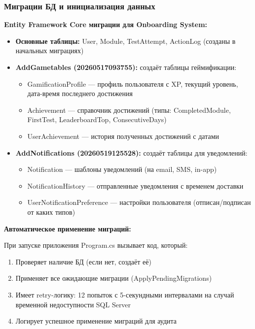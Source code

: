 \subsubsection*{Миграции БД и инициализация данных}

\textbf{Entity Framework Core миграции для Onboarding System:}

\begin{itemize}
	\item \textbf{Основные таблицы:} User, Module, TestAttempt, ActionLog (созданы в начальных миграциях)
	\item \textbf{AddGametables (20260517093755):} создаёт таблицы геймификации:
	\begin{itemize}
		\item GamificationProfile --- профиль пользователя с XP, текущий уровень, дата-время последнего достижения
		\item Achievement --- справочник достижений (типы: CompletedModule, FirstTest, LeaderboardTop, ConsecutiveDays)
		\item UserAchievement --- история полученных достижений с датами
	\end{itemize}
	\item \textbf{AddNotifications (20260519125528):} создаёт таблицы для уведомлений:
	\begin{itemize}
		\item Notification --- шаблоны уведомлений (на email, SMS, in-app)
		\item NotificationHistory --- отправленные уведомления с временем доставки
		\item UserNotificationPreference --- настройки пользователя (отписан/подписан от каких типов)
	\end{itemize}
\end{itemize}

\textbf{Автоматическое применение миграций:}

При запуске приложения Program.cs вызывает код, который:

\begin{enumerate}
	\item Проверяет наличие БД (если нет, создаёт её)
	\item Применяет все ожидающие миграции (ApplyPendingMigrations)
	\item Имеет retry-логику: 12 попыток с 5-секундными интервалами на случай временной недоступности SQL Server
	\item Логирует успешное применение миграций для аудита
\end{enumerate}

